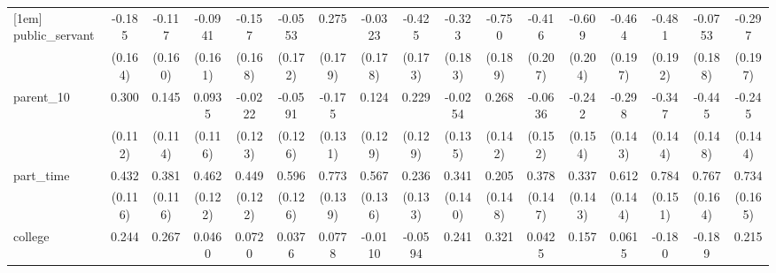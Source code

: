 {\begin{tabular}{l*{16}{c}}
[1em]
public\_servant      &      -0.185         &      -0.117         &     -0.0941         &      -0.157         &     -0.0553         &       0.275         &     -0.0323         &      -0.425\sym{*}  &      -0.323         &      -0.750\sym{***}&      -0.416\sym{*}  &      -0.609\sym{**} &      -0.464\sym{*}  &      -0.481\sym{*}  &     -0.0753         &      -0.297         \\
                    &     (0.164)         &     (0.160)         &     (0.161)         &     (0.168)         &     (0.172)         &     (0.179)         &     (0.178)         &     (0.173)         &     (0.183)         &     (0.189)         &     (0.207)         &     (0.204)         &     (0.197)         &     (0.192)         &     (0.188)         &     (0.197)         \\
[1em]
parent\_10           &       0.300\sym{**} &       0.145         &      0.0935         &     -0.0222         &     -0.0591         &      -0.175         &       0.124         &       0.229         &     -0.0254         &       0.268         &     -0.0636         &      -0.242         &      -0.298\sym{*}  &      -0.347\sym{*}  &      -0.445\sym{**} &      -0.245         \\
                    &     (0.112)         &     (0.114)         &     (0.116)         &     (0.123)         &     (0.126)         &     (0.131)         &     (0.129)         &     (0.129)         &     (0.135)         &     (0.142)         &     (0.152)         &     (0.154)         &     (0.143)         &     (0.144)         &     (0.148)         &     (0.144)         \\
[1em]
part\_time           &       0.432\sym{***}&       0.381\sym{**} &       0.462\sym{***}&       0.449\sym{***}&       0.596\sym{***}&       0.773\sym{***}&       0.567\sym{***}&       0.236         &       0.341\sym{*}  &       0.205         &       0.378\sym{*}  &       0.337\sym{*}  &       0.612\sym{***}&       0.784\sym{***}&       0.767\sym{***}&       0.734\sym{***}\\
                    &     (0.116)         &     (0.116)         &     (0.122)         &     (0.122)         &     (0.126)         &     (0.139)         &     (0.136)         &     (0.133)         &     (0.140)         &     (0.148)         &     (0.147)         &     (0.143)         &     (0.144)         &     (0.151)         &     (0.164)         &     (0.165)         \\
[1em]
college             &       0.244         &       0.267\sym{*}  &      0.0460         &      0.0720         &      0.0376         &      0.0778         &     -0.0110         &     -0.0594         &       0.241         &       0.321         &      0.0425         &       0.157         &      0.0615         &      -0.180         &      -0.189         &       0.215         \\

\end{tabular}}
